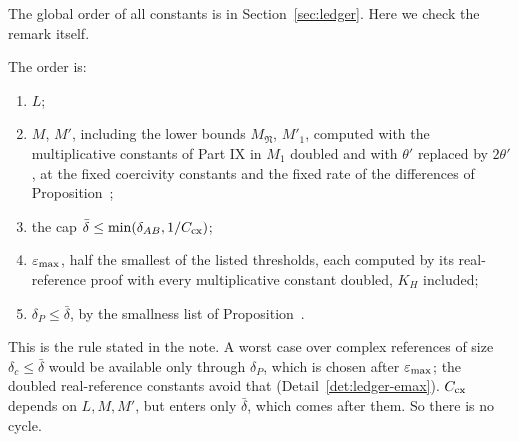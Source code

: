 \begin{detail}\label{d8:dc}
The global order of all constants is in Section~\ref{sec:ledger}. Here we check the remark itself.
\begin{step}
The order is:
\begin{enumerate}[label=(\arabic*)]
\item $L$;
\item $M$, $M'$, including the lower bounds $M_{\mathfrak N}$, $M'_1$, computed with the multiplicative constants of Part IX in $M_1$ doubled and with $\theta'$ replaced by $2\theta'$, at the fixed coercivity constants and the fixed rate of the differences of Proposition~;
\item the cap $\bar\delta\le\min(\delta_{AB},1/C_{\rm cx})$;
\item $\varepsilon_{\max}$, half the smallest of the listed thresholds, each computed by its real-reference proof with every multiplicative constant doubled, $K_H$ included;
\item $\delta_P\le\bar\delta$, by the smallness list of Proposition~.
\end{enumerate}
This is the rule stated in the note. A worst case over complex references of size $\delta_c\le\bar\delta$ would be available only through $\delta_P$, which is chosen after $\varepsilon_{\max}$; the doubled real-reference constants avoid that (Detail~\ref{det:ledger-emax}). $C_{\rm cx}$ depends on $L,M,M'$, but enters only $\bar\delta$, which comes after them. So there is no cycle.


\end{step}
\end{detail}
